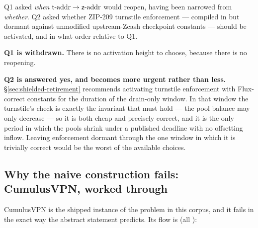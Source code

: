 \begin{remark}
\label{rem:q1q2-resolved}
Q1 asked \emph{when} $\mathsf{t}\text{-addr} \to \mathsf{z}\text{-addr}$ would reopen, having been narrowed from \emph{whether}. Q2
asked whether ZIP-209 turnstile enforcement --- compiled in but dormant against unmodified
upstream-Zcash checkpoint constants --- should be activated, and in what order relative to Q1.

\textbf{Q1 is withdrawn.} There is no activation height to choose, because there is no reopening.

\textbf{Q2 is answered yes, and becomes more urgent rather than less.}
\S\ref{sec:shielded-retirement} recommends activating turnstile enforcement with Flux-correct
constants for the duration of the drain-only window. In that window the turnstile's check is exactly
the invariant that must hold --- the pool balance may only decrease --- so it is both cheap and
precisely correct, and it is the only period in which the pools shrink under a published deadline
with no offsetting inflow. Leaving enforcement dormant through the one window in which it is
trivially correct would be the worst of the available choices.
\end{remark}


\subsection{Why the naive construction fails: CumulusVPN, worked through}
\label{sec:pp-naive}

CumulusVPN is the shipped instance of the problem in this corpus, and it fails in the exact way the
abstract statement predicts. Its flow is (all \shipped):


